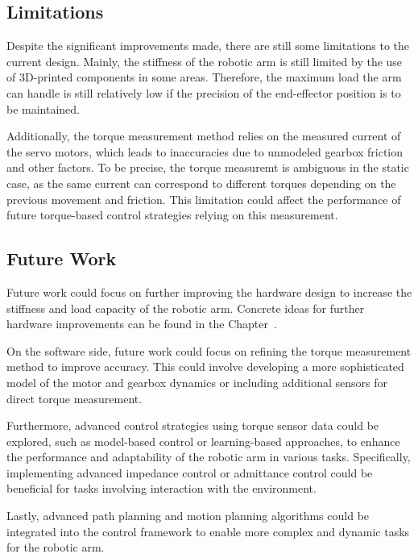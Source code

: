 \subsection{Limitations}
Despite the significant improvements made, there are still some limitations to the current design.
Mainly, the stiffness of the robotic arm is still limited by the use of 3D-printed components in some areas. Therefore, the maximum load the arm can handle is still relatively low
if the precision of the end-effector position is to be maintained.

Additionally, the torque measurement method relies on the measured current of the servo motors, which leads to inaccuracies due to unmodeled gearbox friction and other factors.
To be precise, the torque measuremt is ambiguous in the static case, as the same current can correspond to different torques depending on the previous movement and friction.
This limitation could affect the performance of future torque-based control strategies relying on this measurement.

\subsection{Future Work}
Future work could focus on further improving the hardware design to increase the stiffness and load capacity of the robotic arm.
Concrete ideas for further hardware improvements can be found in the Chapter~.

On the software side, future work could focus on refining the torque measurement method to improve accuracy. This could involve developing a more sophisticated model of the motor and
gearbox dynamics or including additional sensors for direct torque measurement.

Furthermore, advanced control strategies using torque sensor data could be explored, such as model-based control or learning-based approaches, to enhance the performance and
adaptability of the robotic arm in various tasks. Specifically, implementing advanced impedance control or admittance control could be beneficial for tasks involving interaction with
the environment.

Lastly, advanced path planning and motion planning algorithms could be integrated into the control framework to enable more complex and dynamic tasks for the robotic arm.